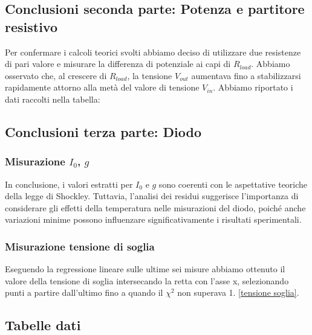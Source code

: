 \documentclass[letterpaper,12pt]{article}
\begin{document}
\subsection{Conclusioni seconda parte: Potenza e partitore resistivo}
Per confermare i calcoli teorici svolti abbiamo deciso di utilizzare due resistenze di pari valore e misurare la differenza di potenziale ai capi di $R_{load}$. Abbiamo  osservato che, al crescere di $R_{load}$, la tensione $V_{out}$ aumentava fino a stabilizzarsi rapidamente attorno alla metà del valore di tensione $V_{in}$. Abbiamo riportato i dati raccolti nella tabella:

\subsection{Conclusioni terza parte: Diodo}
\subsubsection{Misurazione $I_0$, $g$}
In conclusione, i valori estratti per $I_0$ e $g$ sono coerenti con le aspettative teoriche della legge di Shockley. Tuttavia, l'analisi dei residui suggerisce l'importanza di considerare gli effetti della temperatura nelle misurazioni del diodo, poiché anche variazioni minime possono influenzare significativamente i risultati sperimentali.

\subsubsection{Misurazione tensione di soglia}
 Eseguendo la regressione lineare sulle ultime sei misure abbiamo ottenuto il valore della tensione di soglia intersecando la retta con l'asse x, selezionando punti a partire dall'ultimo fino a quando il $\chi^2$ non superava 1. \ref{tensione soglia}.

\newpage    
\subsection{Tabelle dati} 
\end{document}
